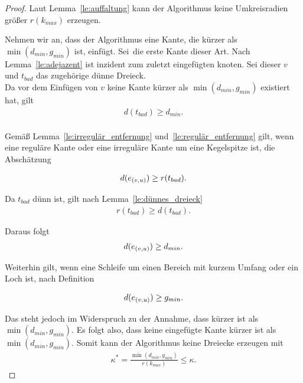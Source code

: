 \begin{proof}

Laut Lemma~\ref{le:auffaltung} kann der Algorithmus keine Umkreisradien größer $r(k_{max})$ erzeugen.

Nehmen wir an, dass der Algorithmus \algorithmusname eine Kante, die kürzer als $\min(d_{min}, g_{min} )$ ist, einfügt. Sei~\regulaereKante[(v,u)] die erste Kante dieser Art. Nach Lemma~\ref{le:adejazent} ist \regulaereKante[(v,u)] inzident zum zuletzt eingefügten knoten. Sei dieser $v$ und $t_{bad}$ das zugehörige dünne Dreieck. \\

Da vor dem Einfügen von $v$ keine Kante kürzer als $\min(d_{min}, g_{min} )$ existiert hat, gilt  
\begin{align*}
    d(t_{bad}) \geq d_{min}.\\
\end{align*} 

Gemäß Lemma~\ref{le:irregulär_entfernung} und~\ref{le:regulär_entfernung} gilt, wenn \regulaereKante[(v,u)] eine reguläre Kante oder eine irreguläre Kante um eine Kegelspitze ist, die Abschätzung

\begin{align*}
    d(\regulaereKante*[(v,u)]) \geq r(t_{bad}).\\
\end{align*} 


Da $t_{bad}$ dünn ist, gilt nach Lemma~\ref{le:dünnes_dreieck} 
\begin{align*}
    r(t_{bad}) \geq d(t_{bad}).
\end{align*}


 Daraus folgt  
 \begin{align*}
     d(\regulaereKante*[(v,u)]) \geq d_{min}.
 \end{align*}

Weiterhin gilt, wenn \regulaereKante[(v,u)] eine Schleife um einen Bereich mit kurzem Umfang oder ein Loch ist, nach Definition

\begin{align*}
     d(\regulaereKante*[(v,u)]) \geq g_{min}.
 \end{align*}



Das steht jedoch im Widerspruch zu der Annahme, dass \regulaereKante[(v,u)] kürzer ist als $\min(d_{min}, g_{min} )$. Es folgt also, dass keine eingefügte Kante kürzer ist als $\min(d_{min}, g_{min} )$. Somit kann der Algorithmus keine Dreiecke erzeugen mit \\
 \begin{align*}
    \kappa^* = \frac{ \min(d_{min}, g_{min} )}{r(k_{max})} \leq \kappa.
 \end{align*}

\end{proof}

